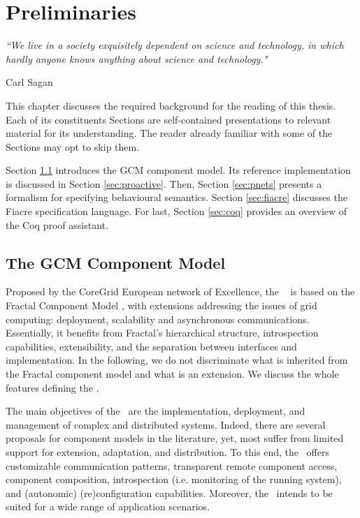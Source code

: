 
\chapter{Preliminaries} 
\label{chap:preli} 


\epigraph{\textit{“We live in a society exquisitely dependent on science and technology, 
                             in which hardly anyone knows anything about science and technology."}}{Carl Sagan}

\minitoc



	This chapter discusses the required background for the reading of this thesis. Each of its constituents
	Sections are self-contained presentations to relevant material for its understanding.
	The reader already familiar with some of the Sections may opt to skip 
	them.
	
	Section \ref{sec:gcm} introduces the GCM component model. Its reference implementation
	is discussed in Section \ref{sec:proactive}. Then, Section \ref{sec:pnets} presents
	a formalism for specifying behavioural semantics. Section \ref{sec:fiacre} discusses
	the Fiacre specification language. For last, Section \ref{sec:coq}
	provides an overview of the Coq proof assistant.





\section{The GCM Component Model}
\label{sec:gcm}

	
	Proposed by the CoreGrid European network of Excellence, the \gcm\ \cite{BCDGHP:Telecom08}
	is based on the Fractal Component Model \cite{fractalSpec}, with extensions addressing the
	issues of grid computing: deployment, scalability and asynchronous communications. Essentially, it benefits from Fractal's
	hierarchical  structure, introspection capabilities, extensibility, and the separation between interfaces and implementation. 
	In the following, we do not discriminate what is inherited from the Fractal 
	component model and what is an extension. We discuss the whole features defining the \gcm.	
	
		The main objectives of the \gcm\ are the implementation, deployment, and management of complex
	and distributed systems. Indeed, there are several proposals for component models in the literature, yet,
	most suffer from limited support for extension, adaptation, and distribution. To this end, the \gcm\
	offers customizable communication patterns, transparent remote component access, component composition,
	introspection (i.e. monitoring of the running system), and (autonomic) (re)configuration capabilities.		
		Moreover, the \gcm\ intends to be suited for a wide range of application scenarios.
		
